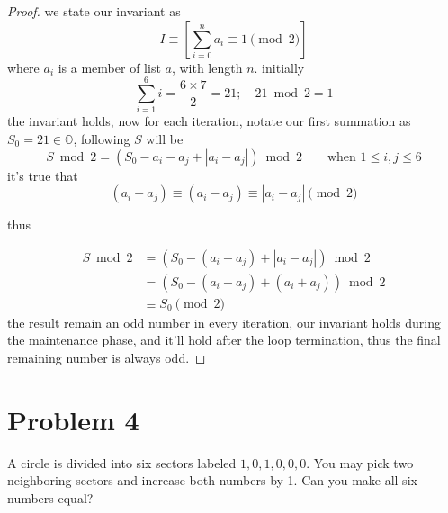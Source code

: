 \begin{proof}
we state our invariant as
\[
I \equiv \left[\sum_{i=0}^n a_i \equiv 1 \pmod 2\right]
\]
where $a_i$ is a member of list $a$, with length $n$.
initially
\[
\sum_{i=1}^6 i = \frac{6 \times 7}{2} = 21;\quad 21 \bmod 2
= 1
\]
the invariant holds, now for each iteration, notate our first
summation as $S_0 = 21 \in \mathbb{O}$, following $S$ will be
\[
S \bmod 2 = (S_0 - a_i - a_j + |a_i - a_j|) \bmod 2 \qquad
\text{when } 1 \le i, j \le 6
\]
it's true that
\[
(a_i + a_j) \equiv (a_i - a_j) \equiv |a_i - a_j| \pmod 2
\]

thus

\[
\begin{aligned}
S \bmod 2 &= (S_0 - (a_i + a_j) + |a_i - a_j|) \bmod 2\\
&= (S_0 - (a_i + a_j) + (a_i + a_j)) \bmod 2\\
&\equiv S_0 \pmod 2
\end{aligned}
\]
the result remain an odd number in every iteration, our
invariant holds during the maintenance phase, and it'll hold
after the loop termination, thus the final remaining number
is always odd.
\end{proof}

\vspace{1em}
\hrulefill

\section*{Problem 4}
A circle is divided into six sectors labeled $1,0,1,0,0,0$. You may pick two neighboring sectors and increase both numbers by 1. Can you make all six numbers equal?

\medskip
\solution

